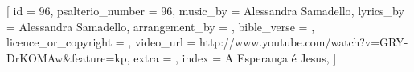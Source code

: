 

[
    id                     = {96},
    psalterio_number       = {96},
    music_by               = {Alessandra Samadello},
    lyrics_by              = {Alessandra Samadello},
    arrangement_by         = {},
    bible_verse            = {},
    licence_or_copyright   = {},
    video_url              = {http://www.youtube.com/watch?v=GRY-DrKOMAw&feature=kp},
    extra                  = {},
    index                  = {A Esperança é Jesus},
]

\beginverse

